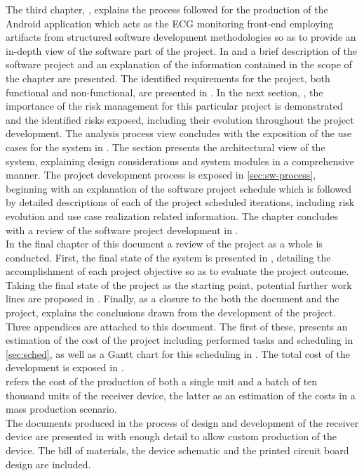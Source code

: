 		The third chapter, \emph{}, explains the process followed for the production of the Android application which acts as the ECG monitoring front-end employing artifacts from structured software development methodologies so as to provide an in-depth view of the software part of the project. In  and  a brief description of the software project and an explanation of the information contained in the scope of the chapter are presented. The identified requirements for the project, both functional and non-functional, are presented in . In the next section, \emph{}, the importance of the risk management for this particular project is demonstrated and the identified risks exposed, including their evolution throughout the project development. The analysis process view concludes with the exposition of the use cases for the system in . The \emph{} section presents the architectural view of the system, explaining design considerations and system modules in a comprehensive manner. The project development process is exposed in \autoref{sec:sw-process}, beginning with an explanation of the software project schedule which is followed by detailed descriptions of each of the project scheduled iterations, including risk evolution and use case realization related information. The chapter concludes with a review of the software project development in .\\

		In the final chapter of this document a review of the project as a whole is conducted. First, the final state of the system is presented in , detailing the accomplishment of each project objective so as to evaluate the project outcome. Taking the final state of the project as the starting point, potential further work lines are proposed in . Finally, as a closure to the both the document and the project,  explains the conclusions drawn from the development of the project.\\

		Three appendices are attached to this document. The first of these,  presents an estimation of the cost of the project including performed tasks and scheduling in \autoref{sec:sched}, as well as a Gantt chart for this scheduling in . The total cost of the development is exposed in .\\

		 refers the cost of the production of both a single unit and a batch of ten thousand units of the receiver device, the latter as an estimation of the costs in a mass production scenario.\\

		The documents produced in the process of design and development of the receiver device are presented in  with enough detail to allow custom production of the device. The bill of materials, the device schematic and the printed circuit board design are included.\\
